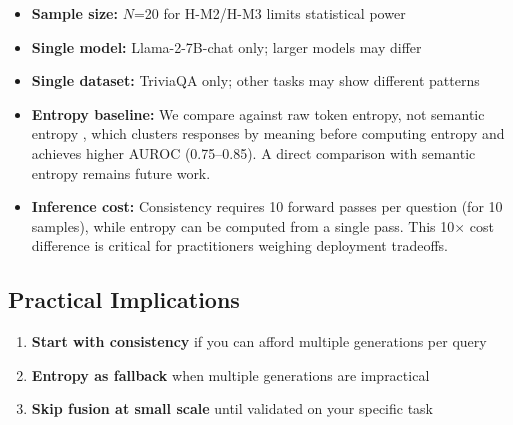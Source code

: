 \begin{itemize}
    \item \textbf{Sample size:} $N$=20 for H-M2/H-M3 limits statistical power
    \item \textbf{Single model:} Llama-2-7B-chat only; larger models may differ
    \item \textbf{Single dataset:} TriviaQA only; other tasks may show different patterns
    \item \textbf{Entropy baseline:} We compare against raw token entropy, not semantic entropy \citep{kuhn2023semantic}, which clusters responses by meaning before computing entropy and achieves higher AUROC (0.75--0.85). A direct comparison with semantic entropy remains future work.
    \item \textbf{Inference cost:} Consistency requires 10 forward passes per question (for 10 samples), while entropy can be computed from a single pass. This 10$\times$ cost difference is critical for practitioners weighing deployment tradeoffs.
\end{itemize}

\subsection{Practical Implications}

\begin{enumerate}
    \item \textbf{Start with consistency} if you can afford multiple generations per query
    \item \textbf{Entropy as fallback} when multiple generations are impractical
    \item \textbf{Skip fusion at small scale} until validated on your specific task
\end{enumerate}
